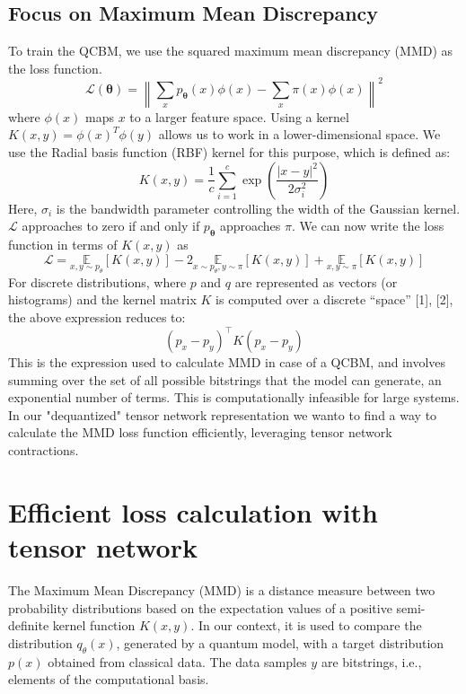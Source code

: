 \subsection{Focus on Maximum Mean Discrepancy}

To train the QCBM, we use the squared maximum mean discrepancy (MMD) as the loss function.
\[ 
\mathcal{L}(\boldsymbol{\theta})=\left\|\sum_x p_{\boldsymbol{\theta}}(x) \phi(x)-\sum_x \pi(x) \phi(x)\right\|^2 
\]
where $\phi(x)$ maps $x$ to a larger feature space. Using a kernel $K(x, y)=\phi(x)^T \phi(y)$ allows us to work in a lower-dimensional space. We use the Radial basis function (RBF) kernel for this purpose, which is defined as:
$$
K(x, y)=\frac{1}{c} \sum_{i=1}^c \exp \left(\frac{|x-y|^2}{2 \sigma_i^2}\right)
$$
Here, $\sigma_i$ is the bandwidth parameter controlling the width of the Gaussian kernel. $\mathcal{L}$ approaches to zero if and only if $p_{\boldsymbol{\theta}}$ approaches $\pi$.
We can now write the loss function in terms of $K(x, y)$ as
$$ 
\mathcal{L}=\underset{x, y \sim p_\theta}{\mathbb{E}}[K(x, y)]-2 \underset{x \sim p_\theta, y \sim \pi}{\mathbb{E}}[K(x, y)]+\underset{x, y \sim \pi}{\mathbb{E}}[K(x, y)] 
$$
For discrete distributions, where $p$ and $q$ are represented as vectors (or histograms) and the kernel matrix $K$ is computed over a discrete “space” [1], [2], the above expression reduces to:
$$ 
\left(p_x-p_y\right)^{\top} K\left(p_x-p_y\right) 
$$
This is the expression used to calculate MMD in case of a QCBM, and involves summing over the set of all possible bitstrings that the model can generate, an exponential number of terms. This is computationally infeasible for large systems. In our "dequantized" tensor network representation we wanto to find a way to calculate the MMD loss function efficiently, leveraging tensor network contractions.

\section[Efficient loss calculation with tensor network]{Efficient loss calculation with tensor network}
The Maximum Mean Discrepancy (MMD) is a distance measure between two probability distributions based on the expectation values of a positive semi-definite kernel function $ K(x, y) $. In our context, it is used to compare the distribution $ q_\theta(x) $, generated by a quantum model, with a target distribution $ p(x) $ obtained from classical data. The data samples $ y $ are bitstrings, i.e., elements of the computational basis.

